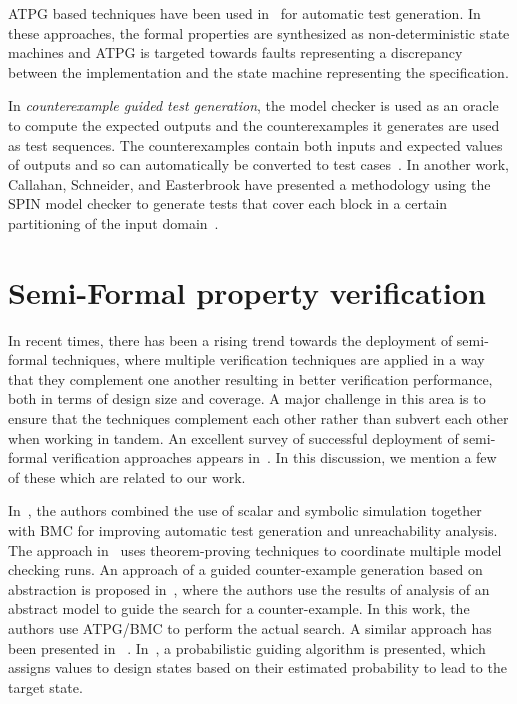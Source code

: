 \noindent
ATPG based techniques have been used in~\cite{abraham:02,boppana:99} for
automatic test generation. In these approaches, the formal properties are
synthesized as non-deterministic state machines and ATPG is targeted towards
faults representing a discrepancy between the implementation and the
state machine representing the specification.

\noindent
In {\em counterexample guided test generation}, the model checker is used as
an oracle to compute the expected outputs and the counterexamples it generates
are used as test sequences. The counterexamples contain both inputs and
expected values of outputs and so can automatically be converted to
test cases~\cite{ammann:98,gargantini:99}. In another work, Callahan,
Schneider, and Easterbrook have presented a methodology using the SPIN model
checker to generate tests that cover each block in a certain partitioning of
the input domain~\cite{callahan:96}. 

\section{Semi-Formal property verification} \label{sec2.3.5}
In recent times, there has been a rising trend towards the 
deployment of semi-formal techniques, where multiple 
verification techniques are applied in a way that they complement 
one another resulting in better verification performance, both in 
terms of design size and coverage. A major challenge in this area 
is to ensure that the techniques complement each other rather than 
subvert each other when working in tandem. An excellent survey of 
successful deployment of semi-formal verification approaches appears 
in~\cite{bhadra:07}. In this discussion, we mention a few of these 
which are related to our work. 

\noindent
In~\cite{ho, ho1}, the authors combined the use of scalar and
symbolic simulation together with BMC for improving automatic test
generation and unreachability analysis. The approach in~\cite{aagard}
uses theorem-proving techniques to coordinate multiple model checking
runs. An approach of a guided counter-example generation based on
abstraction is proposed in~\cite{bjesse}, where the authors use
the results of analysis of an abstract model to guide the search
for a counter-example. In this work, the authors use ATPG/BMC to perform
the actual search. A similar approach has been presented in
~\cite{yuan}. In~\cite{kuehl}, a probabilistic
guiding algorithm is presented, which assigns values to design states
based on their estimated probability to lead to the target state.

